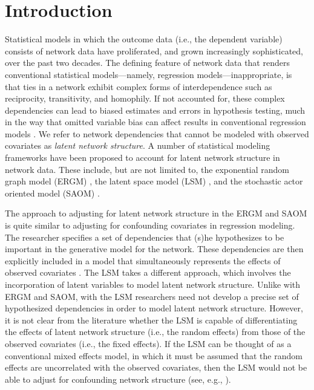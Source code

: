 \documentclass[11pt]{article}
\begin{document}
\section{Introduction}

Statistical models in which the outcome data (i.e., the dependent variable) consists of network data have proliferated, and grown increasingly
sophisticated, over the past two decades. The defining feature of network data that renders conventional statistical models---namely, regression models---inappropriate, is that ties in a network exhibit complex forms of interdependence such as reciprocity, transitivity, and
homophily. If not accounted for, these complex dependencies can lead to biased estimates and
errors in hypothesis testing, much in the way that omitted variable
bias can affect results in conventional regression models
\citep{block2017forms,cranmerisq}.  We refer to network dependencies that cannot be modeled with observed covariates as {\em latent network structure}. A
number of statistical modeling frameworks have been proposed to
account for latent network structure in network data. These include, but are not limited to, the exponential random
graph model (ERGM) \citep[e.g.,
][]{cranmer2011pa,krivitsky2017exponential}, the latent space model
(LSM) \citep[e.g.,
][]{ward2007persistent,kirkland2012multimember,berlusconi2017determinants}, and
the stochastic actor oriented model (SAOM) \citep[e.g.,
][]{snijders2001statistical,berardo2010ajps,kinne2014}.

The approach to adjusting for latent network structure in the ERGM and SAOM is
quite similar to adjusting for confounding covariates in regression
modeling. The researcher specifies a set of dependencies that (s)he
hypothesizes to be important in the generative model for the
network. These dependencies are then explicitly included in a model
that simultaneously represents the effects of observed covariates
\citep{cranmer2011pa}. The LSM takes a different approach, which
involves the incorporation of latent variables to model latent network structure. Unlike with ERGM and SAOM, with the LSM
researchers need not develop a precise set of hypothesized dependencies in
order to model latent network structure. However, it is not clear from the literature whether the
LSM is capable of differentiating the effects of latent network structure (i.e., the random effects)
from those of the observed covariates (i.e., the fixed effects). If the LSM can be thought of as a conventional mixed effects model, in which it must be assumed that the random effects are uncorrelated with the observed covariates, then the LSM would not be able to adjust for confounding network structure (see, e.g., \citep{gardiner2009fixed}). 
\end{document}
